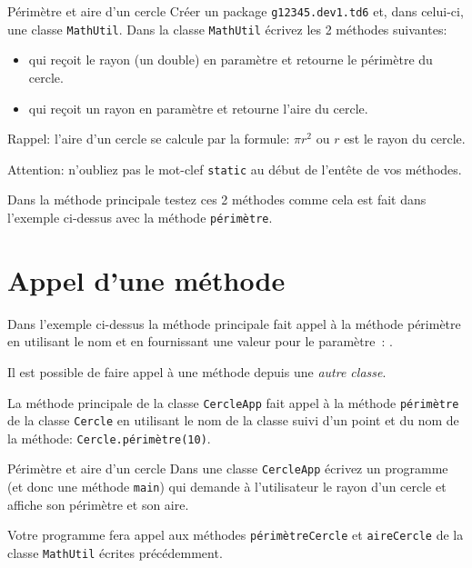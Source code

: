 \documentclass[a4paper,11pt]{style-esi/td}
\begin{document}
	 \begin{Exercice}{Périmètre et aire d'un cercle}		
		Créer un package \texttt{g12345.dev1.td6} et, dans celui-ci, une classe \texttt{MathUtil}.
		Dans la classe \texttt{MathUtil} écrivez les 2 méthodes suivantes: 
		\begin{itemize}
			\item	{} 
				qui reçoit le rayon (un double) en paramètre et retourne le périmètre du cercle.
			\item {} 
				qui reçoit un rayon en paramètre et retourne l'aire du cercle.
		\end{itemize}
		
		Rappel: l'aire d'un cercle se calcule par la formule: $\pi r^2$ ou  $r$ est le rayon du cercle.
		
		Attention: n'oubliez pas le mot-clef \texttt{static} au début de l'entête de vos méthodes.
		
		Dans la méthode principale testez ces 2 méthodes comme cela est fait dans l'exemple ci-dessus avec la méthode 
		\texttt{périmètre}.
	\end{Exercice} 


\section{Appel d'une méthode}

	Dans l'exemple ci-dessus la méthode principale fait appel à la méthode périmètre en utilisant le nom 
	et en fournissant une valeur pour le paramètre~: 
	.
	
	Il est possible de faire appel à une méthode depuis une \emph{autre classe}.
	

	La méthode principale de la classe \texttt{CercleApp} fait appel à la méthode \texttt{périmètre}
	de la classe \texttt{Cercle} en utilisant le nom de la classe suivi d'un point et du nom de la méthode: \texttt{Cercle.périmètre(10)}.
	
	 \begin{Exercice}{Périmètre et aire d'un cercle}		
		Dans une classe \texttt{CercleApp} écrivez un programme (et donc une méthode \texttt{main})
		qui demande à l'utilisateur le rayon d'un cercle et affiche son périmètre et son aire.
		
		Votre programme fera appel aux méthodes \texttt{périmètreCercle} et \texttt{aireCercle} de la classe
		\texttt{MathUtil} écrites précédemment.
	\end{Exercice} 
	
\end{document}
